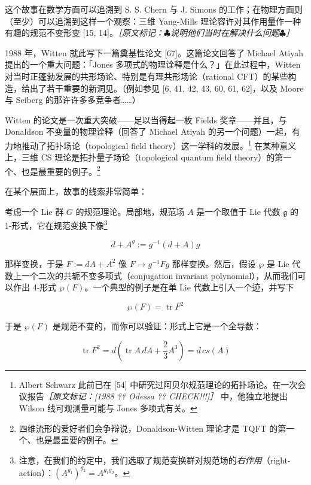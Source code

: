 这个故事在数学方面可以追溯到 S. S. Chern 与 J. Simons 的工作；在物理方面则（至少）可以追溯到这样一个观察：三维 Yang-Mills 理论容许对其作用量作一种有趣的规范不变形变 [15, 14]。{\small\itshape ［原文标记：$\clubsuit$说明他们当时在解决什么问题$\clubsuit$］}%

1988 年，Witten 就此写下一篇奠基性论文 [67]。这篇论文回答了 Michael Atiyah 提出的一个重大问题：「Jones 多项式的物理诠释是什么？」在此过程中，Witten 对当时正蓬勃发展的共形场论、特别是有理共形场论（rational CFT）的某些构造，给出了若干重要的新洞见。（例如参见 [6, 41, 42, 43, 60, 61, 62]，以及 Moore 与 Seiberg 的那许许多多竞争者……）

Witten 的论文是一次重大突破——足以当得起一枚 Fields 奖章——并且，与 Donaldson 不变量的物理诠释（回答了 Michael Atiyah 的另一个问题）一起，有力地推动了拓扑场论（topological field theory）这一学科的发展。\footnote{Albert Schwarz 此前已在 [54] 中研究过阿贝尔规范理论的拓扑场论。在一次会议报告{\small\itshape ［原文标记：[1988 ?? Odessa ?? CHECK!!!]］}%
中，他独立地提出 Wilson 线可观测量可能与 Jones 多项式有关。} 在某种意义上，三维 CS 理论是拓扑量子场论（topological quantum field theory）的第一个、也是最重要的例子。\footnote{四维流形的爱好者们会争辩说，Donaldson-Witten 理论才是 TQFT 的第一个、也是最重要的例子。}

在某个层面上，故事的线索非常简单：

考虑一个 Lie 群 $G$ 的规范理论。局部地，规范场 $A$ 是一个取值于 Lie 代数 $\mathfrak{g}$ 的 1-形式，它在规范变换下像\footnote{注意，在我们的约定中，我们选取了规范变换群对规范场的\emph{右作用}（right-action）：$(A^{g_1})^{g_2}=A^{g_1g_2}$。}

\begin{equation}
  d+A^{g}:=g^{-1}(d+A)g
  \tag{1.1}
  \label{eq:1.1}
\end{equation}

那样变换，于是 $F:=dA+A^2$ 像 $F\to g^{-1}Fg$ 那样变换。然后，假设 $\wp$ 是 Lie 代数上一个二次的共轭不变多项式（conjugation invariant polynomial），从而我们可以作出 4-形式 $\wp(F)$。一个典型的例子是在单 Lie 代数上引入一个迹，并写下

\begin{equation}
  \wp(F)=\operatorname{tr}F^{2}
  \tag{1.2}
  \label{eq:1.2}
\end{equation}

于是 $\wp(F)$ 是规范不变的，而你可以验证：形式上它是一个全导数：

\begin{equation}
  \operatorname{tr}F^{2}=d\left(\operatorname{tr}A\,dA+\frac{2}{3}A^{3}\right)=d\,cs(A)
  \tag{1.3}
  \label{eq:1.3}
\end{equation}

